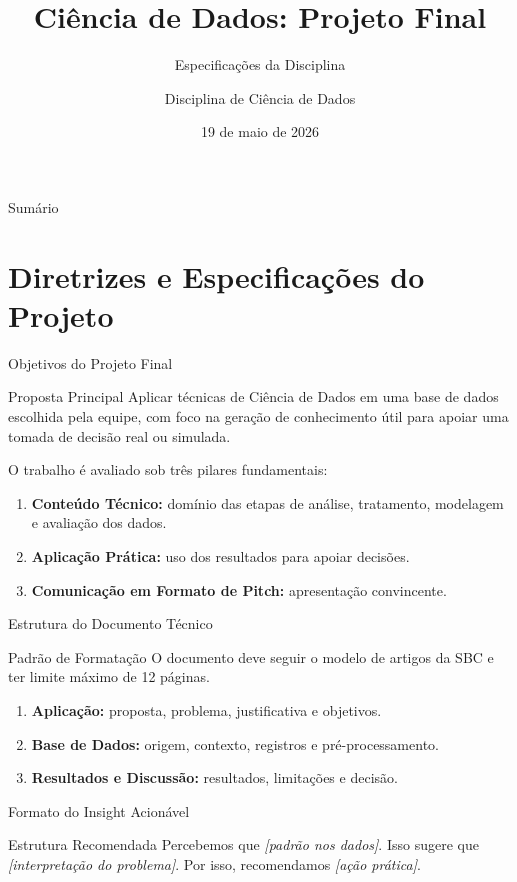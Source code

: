 \documentclass[aspectratio=43]{beamer}
\title{Ciência de Dados: Projeto Final}
\subtitle{Especificações da Disciplina}
\author{Disciplina de Ciência de Dados}
\institute{Universidade Federal de Alagoas}
\date{19 de maio de 2026}
\begin{document}
\begin{frame}
  \titlepage
\end{frame}

\begin{frame}{Sumário}
  \tableofcontents
\end{frame}

\section{Diretrizes e Especificações do Projeto}

\begin{frame}{Objetivos do Projeto Final}

\begin{block}{Proposta Principal}
Aplicar técnicas de Ciência de Dados em uma base de dados escolhida pela equipe,
com foco na geração de conhecimento útil para apoiar uma tomada de decisão real
ou simulada.
\end{block}

O trabalho é avaliado sob três pilares fundamentais:

\begin{enumerate}
  \item \textbf{Conteúdo Técnico:} domínio das etapas de análise, tratamento,
  modelagem e avaliação dos dados.
  \item \textbf{Aplicação Prática:} uso dos resultados para apoiar decisões.
  \item \textbf{Comunicação em Formato de Pitch:} apresentação convincente.
\end{enumerate}

\end{frame}

\begin{frame}{Estrutura do Documento Técnico}

\begin{alertblock}{Padrão de Formatação}
O documento deve seguir o modelo de artigos da SBC e ter limite máximo de 12 páginas.
\end{alertblock}

\begin{enumerate}
  \item \textbf{Aplicação:} proposta, problema, justificativa e objetivos.
  \item \textbf{Base de Dados:} origem, contexto, registros e pré-processamento.
  \item \textbf{Resultados e Discussão:} resultados, limitações e decisão.
\end{enumerate}

\end{frame}

\begin{frame}{Formato do Insight Acionável}

\begin{exampleblock}{Estrutura Recomendada}
Percebemos que \textit{[padrão nos dados]}. Isso sugere que
\textit{[interpretação do problema]}. Por isso, recomendamos
\textit{[ação prática]}.
\end{exampleblock}

\end{frame}
\end{document}
